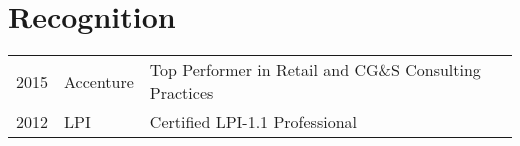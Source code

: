 \documentclass[a4paper]{deedy-resume} %
\begin{document}
\begin{minipage}[t]{0.66\textwidth}




\section{Recognition	} 

\begin{tabular}{rll}
2015 & Accenture & Top Performer in Retail and CG\&S Consulting Practices\\
2012 & LPI 		 & Certified LPI-1.1 Professional

\end{tabular}

\sectionspace %

%
%



\end{minipage} %
\end{document}
